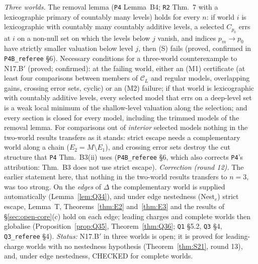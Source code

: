 \documentclass[11pt]{article}
\theoremstyle{definition}
\theoremstyle{remark}
\newcommand{\C}{\mathcal C}
\newcommand{\src}[1]{\texttt{#1}}
\begin{document}
\emph{Three worlds.} The removal lemma (\src{P4} Lemma~B4; \src{R2} Thm.~7 with a lexicographic primary of countably many levels) holds for every $n$: if world $i$ is lexicographic with countably many countably additive levels, a selected $C_{p_0}$ errs at $i$ on a non-null set on which the levels below $j$ vanish, and indices $p_m\to p_0$ have strictly smaller valuation below level $j$, then (S) fails (proved, confirmed in \src{P4B\_referee} \S6). Necessary conditions for a three-world counterexample to N17.B$'$ (proved; confirmed): at the failing world, either an (M1) certificate (at least four comparisons between members of $\C_L$ and regular models, overlapping gains, crossing error sets, cyclic) or an (M2) failure; if that world is lexicographic with countably additive levels, every selected model that errs on a deep-level set is a weak local minimum of the shallow-level valuation along the selection; and every section is closed for every model, including the trimmed models of the removal lemma. For comparisons out of \emph{interior} selected models nothing in the two-world results transfers as it stands: strict escape needs a complementary world along a chain ($E_2=M\setminus E_1$), and crossing error sets destroy the cut structure that \src{P4} Thm.~B3(ii) uses (\src{P4B\_referee} \S6, which also corrects \src{P4}'s attribution: Thm.~B3 does not use strict escape). \emph{Correction (round 12).} The earlier statement here, that nothing in the two-world results transfers to $n=3$, was too strong. On the \emph{edges} of $\Delta$ the complementary world is supplied automatically (Lemma~\ref{lem:Q34}), and under edge nestedness (Nest$_e$) strict escape, Lemma~T, Theorems~\ref{thm:E2} and~\ref{thm:E3} and the results of \S\ref{sec:open-core}(c) hold on each edge; leading charges and complete worlds then globalise (Proposition~\ref{prop:Q35}, Theorem~\ref{thm:Q36}; \src{Q1} \S5.2, \src{Q3} \S4, \src{Q3\_referee} \S4). \emph{Status:} N17.B$'$ in three worlds is open; it is proved for leading-charge worlds with no nestedness hypothesis (Theorem~\ref{thm:S21}, round 13), and, under edge nestedness, CHECKED for complete worlds.
\end{document}
